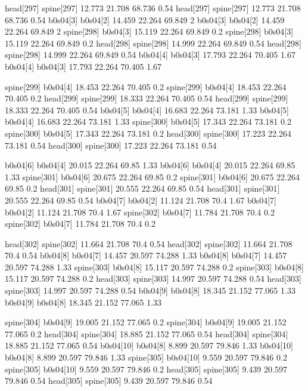 head[297]    spine[297]    12.773    21.708    68.736    0.54
head[297]    spine[297]    12.773    21.708    68.736    0.54
b0s04[3]    b0s04[2]    14.459    22.264    69.849    2
b0s04[3]    b0s04[2]    14.459    22.264    69.849    2
spine[298]    b0s04[3]    15.119    22.264    69.849    0.2
spine[298]    b0s04[3]    15.119    22.264    69.849    0.2
head[298]    spine[298]    14.999    22.264    69.849    0.54
head[298]    spine[298]    14.999    22.264    69.849    0.54
b0s04[4]    b0s04[3]    17.793    22.264    70.405    1.67
b0s04[4]    b0s04[3]    17.793    22.264    70.405    1.67


spine[299]    b0s04[4]    18.453    22.264    70.405    0.2
spine[299]    b0s04[4]    18.453    22.264    70.405    0.2
head[299]    spine[299]    18.333    22.264    70.405    0.54
head[299]    spine[299]    18.333    22.264    70.405    0.54
b0s04[5]    b0s04[4]    16.683    22.264    73.181    1.33
b0s04[5]    b0s04[4]    16.683    22.264    73.181    1.33
spine[300]    b0s04[5]    17.343    22.264    73.181    0.2
spine[300]    b0s04[5]    17.343    22.264    73.181    0.2
head[300]    spine[300]    17.223    22.264    73.181    0.54
head[300]    spine[300]    17.223    22.264    73.181    0.54


b0s04[6]    b0s04[4]    20.015    22.264    69.85    1.33
b0s04[6]    b0s04[4]    20.015    22.264    69.85    1.33
spine[301]    b0s04[6]    20.675    22.264    69.85    0.2
spine[301]    b0s04[6]    20.675    22.264    69.85    0.2
head[301]    spine[301]    20.555    22.264    69.85    0.54
head[301]    spine[301]    20.555    22.264    69.85    0.54
b0s04[7]    b0s04[2]    11.124    21.708    70.4    1.67
b0s04[7]    b0s04[2]    11.124    21.708    70.4    1.67
spine[302]    b0s04[7]    11.784    21.708    70.4    0.2
spine[302]    b0s04[7]    11.784    21.708    70.4    0.2


head[302]    spine[302]    11.664    21.708    70.4    0.54
head[302]    spine[302]    11.664    21.708    70.4    0.54
b0s04[8]    b0s04[7]    14.457    20.597    74.288    1.33
b0s04[8]    b0s04[7]    14.457    20.597    74.288    1.33
spine[303]    b0s04[8]    15.117    20.597    74.288    0.2
spine[303]    b0s04[8]    15.117    20.597    74.288    0.2
head[303]    spine[303]    14.997    20.597    74.288    0.54
head[303]    spine[303]    14.997    20.597    74.288    0.54
b0s04[9]    b0s04[8]    18.345    21.152    77.065    1.33
b0s04[9]    b0s04[8]    18.345    21.152    77.065    1.33


spine[304]    b0s04[9]    19.005    21.152    77.065    0.2
spine[304]    b0s04[9]    19.005    21.152    77.065    0.2
head[304]    spine[304]    18.885    21.152    77.065    0.54
head[304]    spine[304]    18.885    21.152    77.065    0.54
b0s04[10]    b0s04[8]    8.899    20.597    79.846    1.33
b0s04[10]    b0s04[8]    8.899    20.597    79.846    1.33
spine[305]    b0s04[10]    9.559    20.597    79.846    0.2
spine[305]    b0s04[10]    9.559    20.597    79.846    0.2
head[305]    spine[305]    9.439    20.597    79.846    0.54
head[305]    spine[305]    9.439    20.597    79.846    0.54


